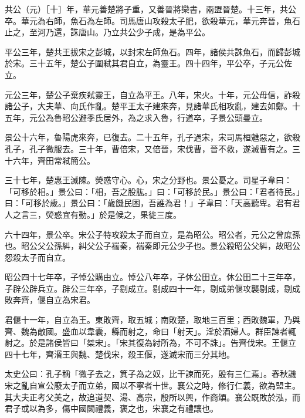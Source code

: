 \begin{pinyinscope}
共公（元）［十］年，華元善楚將子重，又善晉將欒書，兩盟晉楚。十三年，共公卒。華元為右師，魚石為左師。司馬唐山攻殺太子肥，欲殺華元，華元奔晉，魚石止之，至河乃還，誅唐山。乃立共公少子成，是為平公。

平公三年，楚共王拔宋之彭城，以封宋左師魚石。四年，諸侯共誅魚石，而歸彭城於宋。三十五年，楚公子圍弒其君自立，為靈王。四十四年，平公卒，子元公佐立。

元公三年，楚公子棄疾弒靈王，自立為平王。八年，宋火。十年，元公毋信，詐殺諸公子，大夫華、向氏作亂。楚平王太子建來奔，見諸華氏相攻亂，建去如鄭。十五年，元公為魯昭公避季氏居外，為之求入魯，行道卒，子景公頭曼立。

景公十六年，魯陽虎來奔，已復去。二十五年，孔子過宋，宋司馬桓魋惡之，欲殺孔子，孔子微服去。三十年，曹倍宋，又倍晉，宋伐曹，晉不救，遂滅曹有之。三十六年，齊田常弒簡公。

三十七年，楚惠王滅陳。熒惑守心。心，宋之分野也。景公憂之。司星子韋曰：「可移於相。」景公曰：「相，吾之股肱。」曰：「可移於民。」景公曰：「君者待民。」曰：「可移於歲。」景公曰：「歲饑民困，吾誰為君！」子韋曰：「天高聽卑。君有君人之言三，熒惑宜有動。」於是候之，果徙三度。

六十四年，景公卒。宋公子特攻殺太子而自立，是為昭公。昭公者，元公之曾庶孫也。昭公父公孫糾，糾父公子褍秦，褍秦即元公少子也。景公殺昭公父糾，故昭公怨殺太子而自立。

昭公四十七年卒，子悼公購由立。悼公八年卒，子休公田立。休公田二十三年卒，子辟公辟兵立。辟公三年卒，子剔成立。剔成四十一年，剔成弟偃攻襲剔成，剔成敗奔齊，偃自立為宋君。

君偃十一年，自立為王。東敗齊，取五城；南敗楚，取地三百里；西敗魏軍，乃與齊、魏為敵國。盛血以韋囊，縣而射之，命曰「射天」。淫於酒婦人。群臣諫者輒射之。於是諸侯皆曰「桀宋」。「宋其復為紂所為，不可不誅」。告齊伐宋。王偃立四十七年，齊湣王與魏、楚伐宋，殺王偃，遂滅宋而三分其地。

太史公曰：孔子稱「微子去之，箕子為之奴，比干諫而死，殷有三仁焉」。春秋譏宋之亂自宣公廢太子而立弟，國以不寧者十世。襄公之時，修行仁義，欲為盟主。其大夫正考父美之，故追道契、湯、高宗，殷所以興，作商頌。襄公既敗於泓，而君子或以為多，傷中國闕禮義，褒之也，宋襄之有禮讓也。


\end{pinyinscope}